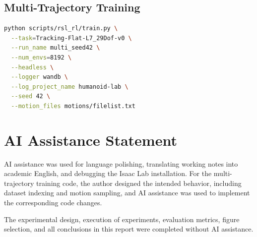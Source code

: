 \documentclass[UTF8]{ctexart}
\begin{document}
\subsection{Multi-Trajectory Training}

\begin{lstlisting}[language=bash]
python scripts/rsl_rl/train.py \
  --task=Tracking-Flat-L7_29Dof-v0 \
  --run_name multi_seed42 \
  --num_envs=8192 \
  --headless \
  --logger wandb \
  --log_project_name humanoid-lab \
  --seed 42 \
  --motion_files motions/filelist.txt
\end{lstlisting}

\section{AI Assistance Statement}

AI assistance was used for language polishing, translating working notes into academic English, and debugging the Isaac Lab installation. For the multi-trajectory training code, the author designed the intended behavior, including dataset indexing and motion sampling, and AI assistance was used to implement the corresponding code changes. 

The experimental design, execution of experiments, evaluation metrics, figure selection, and all conclusions in this report were completed without AI assistance.
\end{document}
